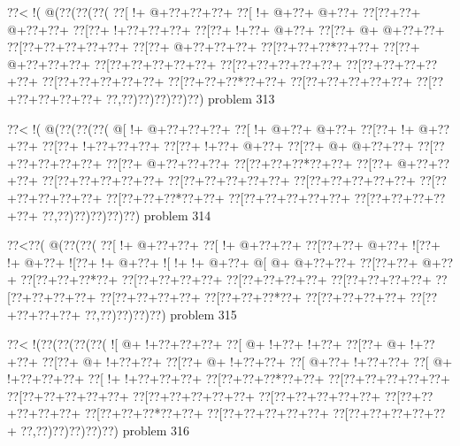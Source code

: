 \vbox{\vbox{\goo
\0??<\- !(\- @(\0??(\0??(\0??(
\0??[\- !+\- @+\0??+\0??+\0??+
\0??[\- !+\- @+\0??+\- @+\0??+
\0??[\0??+\0??+\- @+\0??+\0??+
\0??[\0??+\- !+\0??+\0??+\0??+
\0??[\0??+\- !+\0??+\- @+\0??+
\0??[\0??+\- @+\- @+\0??+\0??+
\0??[\0??+\0??+\0??+\0??+\0??+
\0??[\0??+\- @+\0??+\0??+\0??+
\0??[\0??+\0??+\0??*\0??+\0??+
\0??[\0??+\- @+\0??+\0??+\0??+
\0??[\0??+\0??+\0??+\0??+\0??+
\0??[\0??+\0??+\0??+\0??+\0??+
\0??[\0??+\0??+\0??+\0??+\0??+
\0??[\0??+\0??+\0??+\0??+\0??+
\0??[\0??+\0??+\0??*\0??+\0??+
\0??[\0??+\0??+\0??+\0??+\0??+
\0??[\0??+\0??+\0??+\0??+\0??+
\0??,\0??)\0??)\0??)\0??)\0??)
}
\hfil problem 313\hfil\break
}

\vbox{\vbox{\goo
\0??<\- !(\- @(\0??(\0??(\0??(
\- @[\- !+\- @+\0??+\0??+\0??+
\0??[\- !+\- @+\0??+\- @+\0??+
\0??[\0??+\- !+\- @+\0??+\0??+
\0??[\0??+\- !+\0??+\0??+\0??+
\0??[\0??+\- !+\0??+\- @+\0??+
\0??[\0??+\- @+\- @+\0??+\0??+
\0??[\0??+\0??+\0??+\0??+\0??+
\0??[\0??+\- @+\0??+\0??+\0??+
\0??[\0??+\0??+\0??*\0??+\0??+
\0??[\0??+\- @+\0??+\0??+\0??+
\0??[\0??+\0??+\0??+\0??+\0??+
\0??[\0??+\0??+\0??+\0??+\0??+
\0??[\0??+\0??+\0??+\0??+\0??+
\0??[\0??+\0??+\0??+\0??+\0??+
\0??[\0??+\0??+\0??*\0??+\0??+
\0??[\0??+\0??+\0??+\0??+\0??+
\0??[\0??+\0??+\0??+\0??+\0??+
\0??,\0??)\0??)\0??)\0??)\0??)
}
\hfil problem 314\hfil\break
}

\vbox{\vbox{\goo
\0??<\0??(\- @(\0??(\0??(
\0??[\- !+\- @+\0??+\0??+
\0??[\- !+\- @+\0??+\0??+
\0??[\0??+\0??+\- @+\0??+
\- ![\0??+\- !+\- @+\0??+
\- ![\0??+\- !+\- @+\0??+
\- ![\- !+\- !+\- @+\0??+
\- @[\- @+\- @+\0??+\0??+
\0??[\0??+\0??+\- @+\0??+
\0??[\0??+\0??+\0??*\0??+
\0??[\0??+\0??+\0??+\0??+
\0??[\0??+\0??+\0??+\0??+
\0??[\0??+\0??+\0??+\0??+
\0??[\0??+\0??+\0??+\0??+
\0??[\0??+\0??+\0??+\0??+
\0??[\0??+\0??+\0??*\0??+
\0??[\0??+\0??+\0??+\0??+
\0??[\0??+\0??+\0??+\0??+
\0??,\0??)\0??)\0??)\0??)
}
\hfil problem 315\hfil\break
}

\vbox{\vbox{\goo
\0??<\- !(\0??(\0??(\0??(\0??(
\- ![\- @+\- !+\0??+\0??+\0??+
\0??[\- @+\- !+\0??+\- !+\0??+
\0??[\0??+\- @+\- !+\0??+\0??+
\0??[\0??+\- @+\- !+\0??+\0??+
\0??[\0??+\- @+\- !+\0??+\0??+
\0??[\- @+\0??+\- !+\0??+\0??+
\0??[\- @+\- !+\0??+\0??+\0??+
\0??[\- !+\- !+\0??+\0??+\0??+
\0??[\0??+\0??+\0??*\0??+\0??+
\0??[\0??+\0??+\0??+\0??+\0??+
\0??[\0??+\0??+\0??+\0??+\0??+
\0??[\0??+\0??+\0??+\0??+\0??+
\0??[\0??+\0??+\0??+\0??+\0??+
\0??[\0??+\0??+\0??+\0??+\0??+
\0??[\0??+\0??+\0??*\0??+\0??+
\0??[\0??+\0??+\0??+\0??+\0??+
\0??[\0??+\0??+\0??+\0??+\0??+
\0??,\0??)\0??)\0??)\0??)\0??)
}
\hfil problem 316\hfil\break
}

